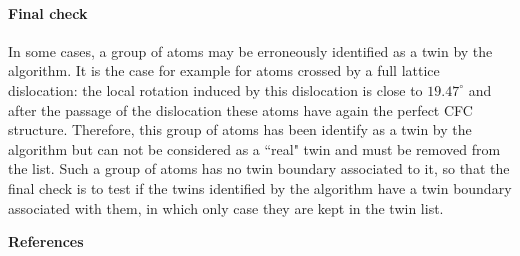 \documentclass[final,3p,times,twocolumn]{elsarticle}
\begin{document}
\paragraph{Final check}
In some cases, a group of atoms may be erroneously identified as a twin by the algorithm. It is the case for example for atoms crossed by a full lattice dislocation: the local rotation induced by this dislocation is close to $ 19.47^{\circ} $ and after the passage of the dislocation these atoms have again the perfect CFC structure. Therefore, this group of atoms has been identify as a twin by the algorithm but can not be considered as a ``real" twin and must be removed from the list. Such a group of atoms has no twin boundary associated to it, so that the final check is to test if the twins identified by the algorithm have a twin boundary associated with them, in which only case they are kept in the twin list.
\newline

\noindent\textbf{References}


\end{document}
